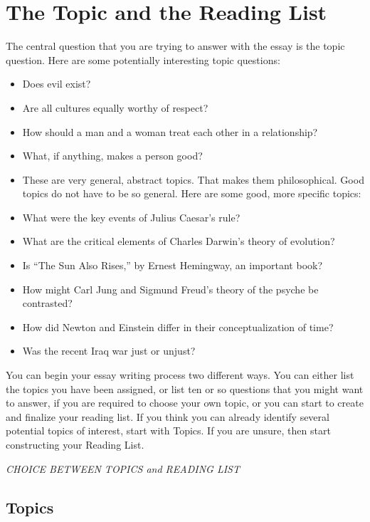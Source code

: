 \documentclass{article}
\begin{document}
\textbf{\hfill\break}

\section{The Topic and the Reading List}

The central question that you are trying to answer with the essay is the
topic question. Here are some potentially interesting topic questions:

\begin{itemize}
  \item Does evil exist?
  \item Are all cultures equally worthy of respect?
  \item How should a man and a woman treat each other in a relationship?
  \item What, if anything, makes a person good?
  \item These are very general, abstract topics. That makes them philosophical.
    Good topics do not have to be so general. Here are some good, more specific
    topics:
  \item What were the key events of Julius Caesar's rule?
  \item What are the critical elements of Charles Darwin's theory of evolution?
  \item Is ``The Sun Also Rises,'' by Ernest Hemingway, an important book?
  \item How might Carl Jung and Sigmund Freud's theory of the psyche be
    contrasted?
  \item How did Newton and Einstein differ in their conceptualization of time?
  \item Was the recent Iraq war just or unjust?
\end{itemize}

You can begin your essay writing process two different ways. You can
either list the topics you have been assigned, or list ten or so
questions that you might want to answer, if you are required to choose
your own topic, or you can start to create and finalize your reading
list. If you think you can already identify several potential topics of
interest, start with Topics. If you are unsure, then start constructing
your Reading List.

\emph{CHOICE BETWEEN TOPICS and READING LIST}

\subsection{Topics}
\end{document}
